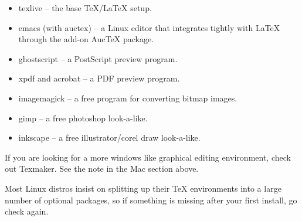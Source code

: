 \begin{itemize}
\item texlive -- the base \TeX{}/\LaTeX{} setup.
\item emacs (with auctex) -- a Linux editor that integrates tightly with \LaTeX{} through the add-on AucTeX package.
\item ghostscript -- a PostScript preview program.
\item xpdf and acrobat -- a PDF preview program.
\item imagemagick -- a free program for converting bitmap images.
\item gimp -- a free photoshop look-a-like.
\item inkscape -- a free illustrator/corel draw look-a-like.
\end{itemize}

If you are looking for a more windows like graphical editing environment,
check out Texmaker. See the note in the Mac section above.

Most Linux distros insist on splitting up their \TeX{} environments into a
large number of optional packages, so if something is missing after your
first install, go check again.

